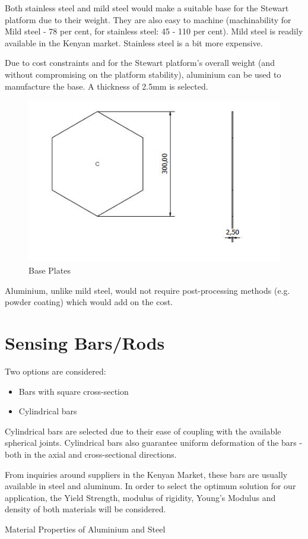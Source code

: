 Both stainless steel and mild steel would make a suitable base for the Stewart platform due to their weight. They are also easy to machine (machinability for Mild steel - 78 per cent, for stainless steel: 45 - 110 per cent). Mild steel is readily available in the Kenyan market. Stainless steel is a bit more expensive.

Due to cost constraints and for the Stewart platform's overall weight (and without compromising on the platform stability), aluminium can be used to manufacture the base. A thickness of 2.5mm is selected.
\begin{center}
	\begin{figure}[!h]
	\centering
	\includegraphics[width=0.6\linewidth]{Figures/Base}
	\caption[Base Plates]{Base Plates}
	\end{figure}
\end{center}
Aluminium, unlike mild steel, would not require post-processing methods (e.g. powder coating) which would add on the cost.
\section{Sensing Bars/Rods}
Two options are considered:
\begin{itemize}
\item Bars with square cross-section
\item Cylindrical bars
\end{itemize}
Cylindrical bars are selected due to their ease of coupling with the available spherical joints. Cylindrical bars also guarantee uniform deformation of the bars - both in the axial and cross-sectional directions.

From inquiries around suppliers in the Kenyan Market, these bars are usually available in steel and aluminum. In order to select the optimum solution for our application, the Yield Strength, modulus of rigidity, Young's Modulus and density of both materials will be considered. 
\begin{table}[!h]
\caption[Aluminium and Steel Properties]{Material Properties of Aluminium and Steel}
\end{table}

